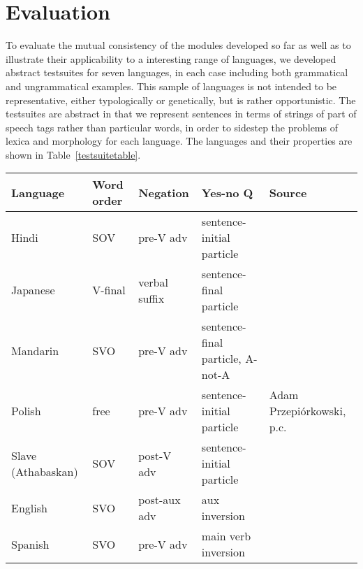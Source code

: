 \documentclass[11pt]{article}
\begin{document}
\section{Evaluation}

To evaluate the mutual consistency of the modules developed so far as
well as to illustrate their applicability to a interesting range of
languages, we developed abstract testsuites for seven languages, in each
case including both grammatical and ungrammatical examples.  This
sample of languages is not intended to be representative, either
typologically or genetically, but is rather opportunistic.  The
testsuites are abstract in that we represent sentences in terms of
strings of part of speech tags rather than particular words, in order
to sidestep the problems of lexica and morphology for each language.
The languages and their properties are shown in Table~\ref{testsuitetable}.

\begin{table*}[ht]
\begin{center}
\small
\begin{tabular}{lllll}
\hline
Language & Word order & Negation & Yes-no Q\footnotemark & Source\\ \hline
Hindi    & SOV        & pre-V adv 	& sentence-initial particle& \cite{Sne:Wei:00}\\
Japanese & V-final    & verbal suffix   & sentence-final particle & \\
Mandarin & SVO	      & pre-V adv	& sentence-final particle, A-not-A & \cite{Li*81}\\
Polish   & free	      & pre-V adv       & sentence-initial particle & Adam Przepi\'{o}rkowski, p.c.\\
Slave (Athabaskan) & SOV & post-V adv	& sentence-initial particle & \cite{Rice89}\\
English  & SVO	      & post-aux adv\footnotemark	& aux inversion &\\
Spanish  & SVO	      & pre-V adv	& main verb inversion & \\ \hline
\end{tabular}
\end{center}
\caption{Languages used in testing}
\label{testsuitetable}
\end{table*}

\addtocounter{footnote}{-1}
\addtocounter{footnote}{1}
\end{document}
